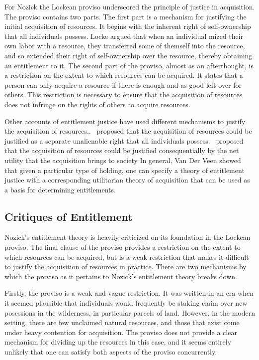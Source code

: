 For Nozick the Lockean proviso underscored the principle of justice in
acquisition. The proviso contains two parts. The first part is a mechanism for 
justifying the initial acquisition of resources. It begins with the inherent 
right of self-ownership that all individuals possess. Locke argued that when 
an individual mized their own labor with a resource, they transferred some of 
themself into the resource, and so extended their right of self-ownership over 
the resource, thereby obtaining an entitlement to it. The second part of the
proviso, almost as an afterthought, is a restriction on the extent to which 
resources can be acquired. It states that a person can only acquire a resource
if there is enough and as good left over for others. This restriction is
necessary to ensure that the acquisition of resources does not infringe on the
rights of others to acquire resources.

Other accounts of entitlement justice have used different mechanisms to justify
the acquisition of resources..~\cite{Mack_1990} proposed that the acquisition of
resources could be justified as a separate unalienable right that all
individuals possess.~\cite{Van_der_Veen_1985} proposed that the acquisition of
resources could be justified consequentially by the net utility that the
acquisition brings to society In general, Van Der Veen showed that given a
particular type of holding, one can specify a theory of entitlement justice with
a corresponding utilitarian theory of acquisition that can be used as a basis
for determining entitlements.

\subsection{Critiques of Entitlement}

Nozick's entitlement theory is heavily criticized on its foundation in the
Lockean proviso. The final clause of the proviso provides a restriction on the
extent to which resources can be acquired, but is a weak restriction that makes
it difficult to justify the acquisition of resources in practice. There are two 
mechanisms by which the proviso as it pertains to Nozick's entitlement theory 
breaks down.

Firstly, the proviso is a weak and vague restriction. It was written in an era 
when it seemed plausible that individuals would frequently be staking claim over
new posessions in the wilderness, in particular parcels of land. However, in the
modern setting, there are few unclaimed natural resources, and those that exist
come under heavy contention for acquisition. The proviso does not provide a
clear mechanism for dividing up the resources in this case, and it seems
entirely unlikely that one can satisfy both aspects of the proviso concurrently.

